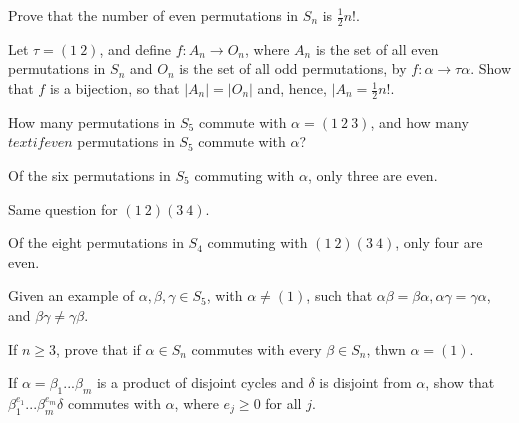 \documentclass[15pt]{article}
\newenvironment{exercise}[2][Exercise]{\begin{trivlist}
\item[\hskip \labelsep {\bfseries #1}\hskip \labelsep {\bfseries #2.}]}
{\end{trivlist}}
\newenvironment{hint}[2][Hint]{\begin{trivlist}
    \item[\hskip \labelsep {\bfseries #1}\hskip \labelsep {\bfseries #2.}]}
    {\end{trivlist}}
\begin{document}
\begin{exercise}{1.22}
    Prove that the number of even permutations in $S_n$ is $\frac{1}2 n!$.
    \begin{hint}{}
        Let $\tau=(1\:2)$, and define $f: A_n\rightarrow O_n$, where $A_n$ is the set of all even permutations in $S_n$ and $O_n$ is the set of all odd permutations, by $f:\alpha \rightarrow \tau\alpha$. Show that $f$ is a bijection, so that $|A_n|=|O_n|$ and, hence, $|A_n=\frac{1}2 n!$.
    \end{hint}
\end{exercise}


\begin{exercise}{1.23}
    \begin{enumerate}
        \item[(i)] How many permutations in $S_5$ commute with $\alpha = (1\:2\:3)$, and how many $textif{even}$ permutations in $S_5$ commute with $\alpha$?
        \begin{hint}{}
            Of the six permutations in $S_5$ commuting with $\alpha$, only three are even.
        \end{hint} 
        \item[(ii)] Same question for $(1\:2)(3\:4)$.
        \begin{hint}{}
            Of the eight permutations in $S_4$ commuting with $(1\:2)(3\:4)$, only four are even.
        \end{hint} 
    \end{enumerate}
\end{exercise}



\begin{exercise}{1.24}
    Given an example of $\alpha,\beta,\gamma \in S_5$, with $\alpha \neq(1)$, such that $\alpha\beta = \beta\alpha, \alpha\gamma = \gamma\alpha$, and $\beta\gamma \neq \gamma\beta$.
\end{exercise}



\begin{exercise}{1.25}
    If $n\geq3$, prove that if $\alpha\in S_n$ commutes with every $\beta\in S_n$, thwn $\alpha=(1)$.
\end{exercise}


\begin{exercise}{1.26}
    If $\alpha=\beta_1...\beta_m$ is a product of disjoint cycles and $\delta$ is disjoint from $\alpha$, show that $\beta_1^{e_1}...\beta_m^{e_m}\delta$ commutes with $\alpha$, where $e_j\geq0$ for all $j$.
\end{exercise}
\end{document}
